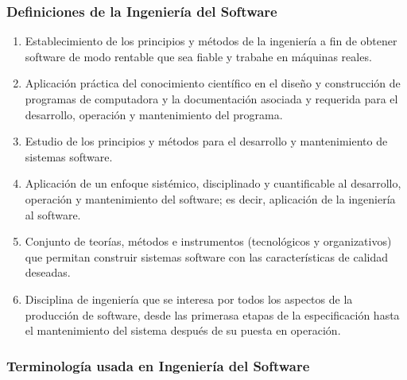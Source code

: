 \documentclass[12pt,spanish]{article}
\begin{document}
\subsubsection{Definiciones de la Ingeniería del Software}

\begin{enumerate}
	\item Establecimiento de los principios y métodos de la ingeniería a fin de obtener software de modo rentable que sea fiable y trabahe en máquinas reales.
	\item Aplicación práctica del conocimiento científico en el diseño y construcción de programas de computadora y la documentación asociada y requerida para el desarrollo, operación y mantenimiento del programa.
	\item Estudio de los principios y métodos para el desarrollo y mantenimiento de sistemas software.
	\item Aplicación de un enfoque sistémico, disciplinado y cuantificable al desarrollo, operación y mantenimiento del software; es decir, aplicación de la ingeniería al software.
	\item Conjunto de teorías, métodos e instrumentos (tecnológicos y organizativos) que permitan construir sistemas software con las características de calidad deseadas.
	\item Disciplina de ingeniería que se interesa por todos los aspectos de la producción de software, desde las primerasa etapas de la especificación hasta el mantenimiento del sistema después de su puesta en operación.
\end{enumerate}

\subsubsection{Terminología usada en Ingeniería del Software}
\end{document}
